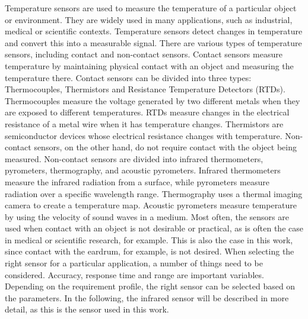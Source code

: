 Temperature sensors are used to measure the temperature of a particular object or environment.
They are widely used in many applications, such as industrial, medical or scientific contexts.
Temperature sensors detect changes in temperature and convert this into a measurable signal.
There are various types of temperature sensors, including contact and non-contact sensors.
Contact sensors measure temperature by maintaining physical contact with an object and measuring the temperature there.
Contact sensors can be divided into three types: Thermocouples, Thermistors and Resistance Temperature Detectors (RTDs). 
Thermocouples measure the voltage generated by two different metals when they are exposed to different temperatures.
RTDs measure changes in the electrical resistance of a metal wire when it has temperature changes.
Thermistors are semiconductor devices whose electrical resistance changes with temperature.
Non-contact sensors, on the other hand, do not require contact with the object being measured. 
Non-contact sensors are divided into infrared thermometers, pyrometers, thermography, and acoustic pyrometers.
Infrared thermometers measure the infrared radiation from a surface, while pyrometers measure radiation over a specific wavelength range.
Thermography uses a thermal imaging camera to create a temperature map.
Acoustic pyrometers measure temperature by using the velocity of sound waves in a medium.
Most often, the sensors are used when contact with an object is not desirable or practical, as is often the case in medical or scientific research, for example. 
This is also the case in this work, since contact with the eardrum, for example, is not desired.
When selecting the right sensor for a particular application, a number of things need to be considered.
Accuracy, response time and range are important variables.
Depending on the requirement profile, the right sensor can be selected based on the parameters.
In the following, the infrared sensor will be described in more detail, as this is the sensor used in this work.

